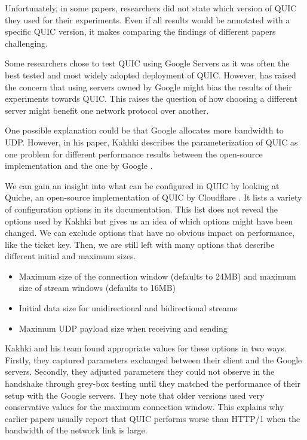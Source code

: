\documentclass[conference]{IEEEtran}
\begin{document}
Unfortunately, in some papers, researchers did not state which version of QUIC they used for their experiments. Even if all results would be annotated with a specific QUIC version, it makes comparing the findings of different papers challenging.

Some researchers chose to test QUIC using Google Servers as it was often the best tested and most widely adopted deployment of QUIC. However, \cite{Nepomuceno} has raised the concern that using servers owned by Google might bias the results of their experiments towards QUIC. This raises the question of how choosing a different server might benefit one network protocol over another.

One possible explanation could be that Google allocates more bandwidth to UDP. However, in his paper, Kakhki describes the parameterization of QUIC as one problem for different performance results between the open-source implementation and the one by Google \cite{Kakhki}. 

We can gain an insight into what can be configured in QUIC by looking at Quiche, an open-source implementation of QUIC by Cloudflare \cite{Quiche}. It lists a variety of configuration options in its documentation. This list does not reveal the options used by Kakhki but gives us an idea of which options might have been changed. We can exclude options that have no obvious impact on performance, like the ticket key. Then, we are still left with many options that describe different initial and maximum sizes.

\begin{itemize}
  \item Maximum size of the connection window (defaults to 24MB) and maximum size of stream windows (defaults to 16MB)
  \item Initial data size for unidirectional and bidirectional streams
  \item Maximum UDP payload size when receiving and sending
\end{itemize}

Kakhki and his team found appropriate values for these options in two ways. Firstly, they captured parameters exchanged between their client and the Google servers. Secondly, they adjusted parameters they could not observe in the handshake through grey-box testing until they matched the performance of their setup with the Google servers. They note that older versions used very conservative values for the maximum connection window. This explains why earlier papers usually report that QUIC performs worse than HTTP/1 when the bandwidth of the network link is large.
\end{document}
